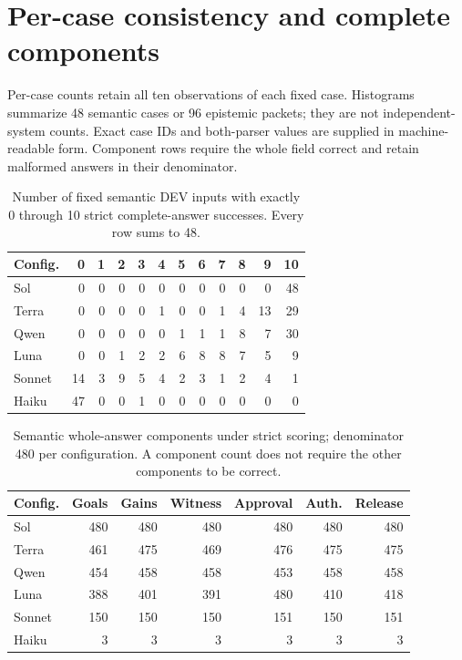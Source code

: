 \documentclass[a4paper,preprint,12pt,numbers,nopreprintline]{elsarticle}
\begin{document}

\section{Per-case consistency and complete components}\label{app:components}
Per-case counts retain all ten observations of each fixed case. Histograms summarize 48 semantic cases or 96 epistemic packets; they are not independent-system counts. Exact case IDs and both-parser values are supplied in machine-readable form. Component rows require the whole field correct and retain malformed answers in their denominator.
\begin{table}[htbp]\centering\scriptsize
\caption{Number of fixed semantic DEV inputs with exactly 0 through 10 strict complete-answer successes. Every row sums to 48.}\label{tab:consistency-semantic}
\setlength{\tabcolsep}{3pt}
\begin{tabular}{lrrrrrrrrrrr}\toprule
Config. & 0 & 1 & 2 & 3 & 4 & 5 & 6 & 7 & 8 & 9 & 10\\\midrule
Sol & 0 & 0 & 0 & 0 & 0 & 0 & 0 & 0 & 0 & 0 & 48\\
Terra & 0 & 0 & 0 & 0 & 1 & 0 & 0 & 1 & 4 & 13 & 29\\
Qwen & 0 & 0 & 0 & 0 & 0 & 1 & 1 & 1 & 8 & 7 & 30\\
Luna & 0 & 0 & 1 & 2 & 2 & 6 & 8 & 8 & 7 & 5 & 9\\
Sonnet & 14 & 3 & 9 & 5 & 4 & 2 & 3 & 1 & 2 & 4 & 1\\
Haiku & 47 & 0 & 0 & 1 & 0 & 0 & 0 & 0 & 0 & 0 & 0\\
\bottomrule\end{tabular}
\end{table}
\begin{table}[htbp]\centering\scriptsize
\caption{Semantic whole-answer components under strict scoring; denominator 480 per configuration. A component count does not require the other components to be correct.}\label{tab:components-semantic-primary}
\setlength{\tabcolsep}{3pt}
\begin{tabular}{lrrrrrr}\toprule
Config. & Goals & Gains & Witness & Approval & Auth. & Release\\\midrule
Sol & 480 & 480 & 480 & 480 & 480 & 480\\
Terra & 461 & 475 & 469 & 476 & 475 & 475\\
Qwen & 454 & 458 & 458 & 453 & 458 & 458\\
Luna & 388 & 401 & 391 & 480 & 410 & 418\\
Sonnet & 150 & 150 & 150 & 151 & 150 & 151\\
Haiku & 3 & 3 & 3 & 3 & 3 & 3\\
\bottomrule\end{tabular}
\end{table}
\end{document}
